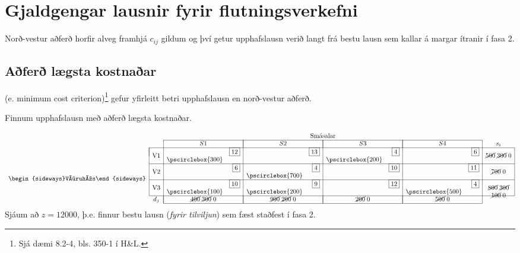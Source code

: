 \section{Gjaldgengar lausnir fyrir flutningsverkefni}
Norð-vestur aðferð horfir alveg framhjá $c_{ij}$ gildum og því getur upphafslausn verið langt frá bestu lausn sem kallar á margar ítranir í fasa 2.

\subsection{Aðferð lægsta kostnaðar}
 (e. minimum cost criterion)\footnote{Sjá dæmi 8.2-4, bls. 350-1 í H\&L.} gefur yfirleitt betri upphafslausn en norð-vestur aðferð.
\begin{lausn} Finnum upphafslausn með aðferð lægsta kostnaðar. 

\[ \begin{array}{cccr|cr|cr|crcc}
 & & \multicolumn{8}{c}{\mbox{Smásalar}} \\ \cline{3-10}
 & & \multicolumn{2}{|c|}{S1} & \multicolumn{2}{|c|}{S2} & \multicolumn{2}{|c|}{S3}& \multicolumn{2}{|c|}{S4} & s_i \\ \cline{2-11}
\multicolumn{1}{c|}{\multirow{8}{*}{\begin{sideways}Vöruhús\end{sideways}}} 
& \multicolumn{1}{|c|}{\multirow{2}{*}{V1}} &   & \scriptscriptstyle{\fbox{12}}&    & \scriptscriptstyle{\fbox{13}} & & \scriptscriptstyle{\fbox{4}}& & \scriptscriptstyle{\fbox{6}} & \multicolumn{1}{|c|}{\multirow{2}{*}{\cancel{500}\;\cancel{300}\;0}}  \\ 
& \multicolumn{1}{|c|}{                  } & \pscirclebox{300} &&& & \pscirclebox{200}&    & & & \multicolumn{1}{|c|}{}\\ \cline{2-11}
& \multicolumn{1}{|c|}{\multirow{2}{*}{V2}} &   & \scriptscriptstyle{\fbox{6}}&    & \scriptscriptstyle{\fbox{4}} & & \scriptscriptstyle{\fbox{10}}& & \scriptscriptstyle{\fbox{11}} & \multicolumn{1}{|c|}{\multirow{2}{*}{\cancel{700}\;0}}  \\ 
& \multicolumn{1}{|c|}{                  } &  &    & \pscirclebox{700}&    & & &&   & \multicolumn{1}{|c|}{}\\ \cline{2-11}
& \multicolumn{1}{|c|}{\multirow{2}{*}{V3}} &   & \scriptscriptstyle{\fbox{10}}&    & \scriptscriptstyle{\fbox{9}} &  & \scriptscriptstyle{\fbox{12}} & & \scriptscriptstyle{\fbox{4}} & \multicolumn{1}{|c|}{\multirow{2}{*}{\cancel{800}\;\cancel{300}}} \\ 
& \multicolumn{1}{|c|}{                  } &    \pscirclebox{100}&    & \pscirclebox{200}& &&  & \pscirclebox{500}& & \multicolumn{1}{|c|}{\multirow{2}{*}{\cancel{100}\;0}}\\ \cline{2-11}
&  \multicolumn{1}{c|}{d_j}& \multicolumn{2}{|c|}{\cancel{400}\;\cancel{300}\;0} & \multicolumn{2}{|c|}{\cancel{900}\;\cancel{200}\;0} & \multicolumn{2}{|c|}{\cancel{200}\;0} &\multicolumn{2}{|c|}{\cancel{500}\;0} & \\ \cline{3-10}
\end{array}
\]
Sjáum að $z=12000$, þ.e. finnur bestu lausn (\emph{fyrir tilviljun}) sem fæst staðfest í fasa 2.
\end{lausn}

